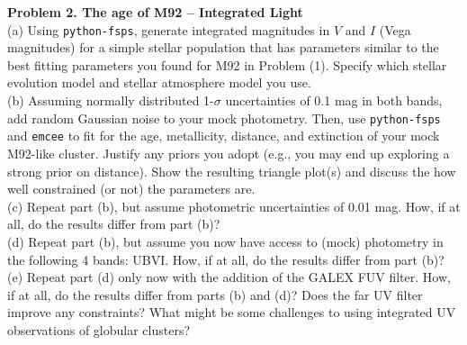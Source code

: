 \documentclass{article}
\begin{document}
\noindent \textbf{Problem 2. The age of M92 -- Integrated Light} \\ 


(a) Using \texttt{python-fsps}, generate integrated magnitudes in $V$ and $I$ (Vega magnitudes) for a simple stellar population that has parameters similar to the best fitting parameters you found for M92  in  Problem (1).  Specify which stellar evolution model and stellar atmosphere model you use. \\

(b) Assuming normally distributed 1-$\sigma$ uncertainties of 0.1 mag in both bands, add random Gaussian noise to your mock photometry.  Then, use \texttt{python-fsps} and \texttt{emcee} to fit for the age, metallicity, distance, and extinction of your mock M92-like cluster.  Justify any priors you adopt (e.g., you may end up exploring a strong prior on distance).  Show the resulting triangle plot(s) and discuss the how well constrained (or not) the parameters are.  \\

(c) Repeat part (b), but assume photometric uncertainties of 0.01 mag.  How, if at all, do the results differ from part (b)? \\

(d) Repeat part (b), but assume you now have access to (mock) photometry in the following 4 bands: UBVI.  How, if at all, do the results differ from part (b)? \\

(e) Repeat part (d) only now with the addition of the GALEX FUV filter.  How, if at all, do the results differ from parts (b) and (d)?  Does the far UV filter improve any constraints? What might be some challenges to using integrated UV observations of globular clusters? \\
\end{document}
